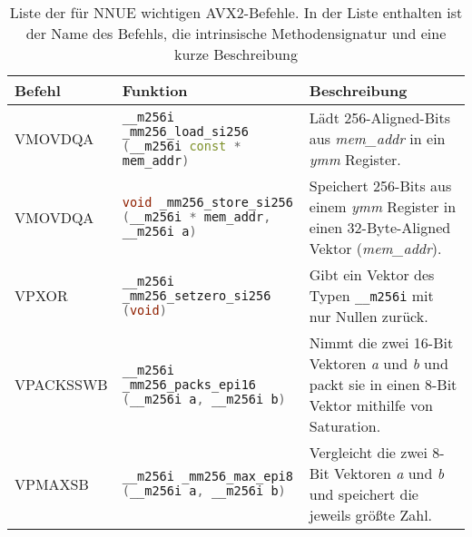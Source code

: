 \begin{table}[ht]
  \caption{Liste der für \ac{NNUE} wichtigen \ac{AVX2}-Befehle. In der Liste enthalten ist der Name des Befehls, die intrinsische Methodensignatur und eine kurze Beschreibung \cite{intelIntrinsics}}
  \label{table:nnueInstructions}
  \renewcommand{\arraystretch}{1.2}
  \centering
  \sffamily
  \begin{footnotesize}
    \begin{tabularx}{\textwidth}{l X X}
      \toprule
      \textbf{Befehl} & \textbf{Funktion}                                                                                                                                                                                    & \textbf{Beschreibung} \\
      \midrule
      VMOVDQA         & \lstinline[language=C++]{__m256i _mm256_load_si256 (__m256i const * mem_addr)} & Lädt 256-Aligned-Bits aus \emph{mem\_addr} in ein \emph{ymm} Register.                                                                                                                                                                 \\
      VMOVDQA         & \lstinline[language=C++]{void _mm256_store_si256 (__m256i * mem_addr, __m256i a)} & Speichert 256-Bits aus einem \emph{ymm} Register in einen 32-Byte-Aligned Vektor (\emph{mem\_addr}).                                                                                                                                      \\
      VPXOR           & \lstinline[language=C++]{__m256i _mm256_setzero_si256 (void)} & Gibt ein Vektor des Typen \lstinline[language=C++]{__m256i} mit nur Nullen zurück.                                                                                                                                                                        \\
      VPACKSSWB       & \lstinline[language=C++]{__m256i _mm256_packs_epi16 (__m256i a, __m256i b)} & Nimmt die zwei 16-Bit Vektoren \emph{a} und \emph{b} und packt sie in einen 8-Bit Vektor mithilfe von Saturation.                                                                                                                           \\
      VPMAXSB         & \lstinline[language=C++]{__m256i _mm256_max_epi8 (__m256i a, __m256i b)}    & Vergleicht die zwei 8-Bit Vektoren \emph{a} und \emph{b} und speichert die jeweils größte Zahl.                                                                                                                                                 \\

\end{tabularx}
\end{footnotesize}
\end{table}
